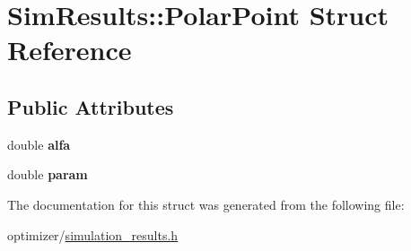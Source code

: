 \hypertarget{struct_sim_results_1_1_polar_point}{}\section{Sim\+Results\+:\+:Polar\+Point Struct Reference}
\label{struct_sim_results_1_1_polar_point}
\subsection*{Public Attributes}
\begin{DoxyCompactItemize}
\item 
\hypertarget{struct_sim_results_1_1_polar_point_a42f2c76e058f9f40c22be5194e30ed9b}{}\label{struct_sim_results_1_1_polar_point_a42f2c76e058f9f40c22be5194e30ed9b} 
double {\bfseries alfa}
\item 
\hypertarget{struct_sim_results_1_1_polar_point_ad3fd235e4e540eb0d1ecb0cdade8054b}{}\label{struct_sim_results_1_1_polar_point_ad3fd235e4e540eb0d1ecb0cdade8054b} 
double {\bfseries param}
\end{DoxyCompactItemize}


The documentation for this struct was generated from the following file\+:\begin{DoxyCompactItemize}
\item 
optimizer/\hyperlink{simulation__results_8h}{simulation\+\_\+results.\+h}\end{DoxyCompactItemize}
